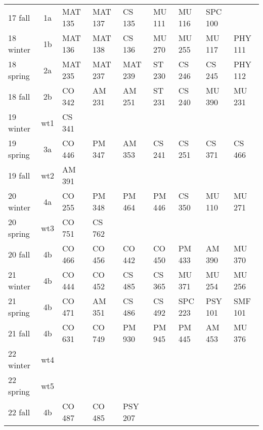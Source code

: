 \documentclass[convert]{standalone}
\begin{document}
\begin{tabular}{|l | c | lllllll|}
	\hline
	17 fall & 1a & MAT 135 & MAT 137  & CS 135 & MU 111 & MU 116 & SPC 100 & \\
	18 winter & 1b & MAT 136 & MAT 138  & CS 136 & MU 270 & MU 255 & MU 117 & PHY 111 \\
	18 spring & 2a & MAT 235 & MAT 237 & MAT 239 & ST 230  & CS 246  & CS 245 & PHY 112\\
	18 fall & 2b & CO 342 & AM 231 & AM 251 & ST 231 & CS 240 & MU 390 & MU 231  \\
	19 winter & wt1 & CS 341 & & & & & & \\
	19 spring & 3a & CO 446 & PM 347 & AM 353  & CS 241 & CS 251 & CS 371 & CS 466  \\
	19 fall & wt2 & AM 391& & & & & & \\
	20 winter & 4a & CO 255 & PM 348 & PM 464 & PM 446 & CS 350  & MU 110 & MU 271  \\
	20 spring & wt3 & CO 751 & CS 762 & & & & & \\
	20 fall & 4b & CO 466 & CO 456 & CO 442  & CO 450 & PM 433 & AM 390  & MU 370    \\
	21 winter & 4b & CO 444 & CO 452 & CS 485  & CS 365 & MU 371  & MU 254 &  MU 256  \\
	21 spring & 4b & CO 471 & AM 351 & CS 486 & CS 492  & SPC 223 & PSY 101 & SMF 101\\
	21 fall & 4b & CO 631 & CO 749 & PM 930 & PM 945 & PM 445 & AM 453  & MU 376  \\
	22 winter & wt4 & & & & & & & \\
	22 spring & wt5 & & & & & & & \\
	22 fall & 4b & CO 487 & CO 485 & PSY 207 & & & & \\\hline

\end{tabular}
\end{document}
